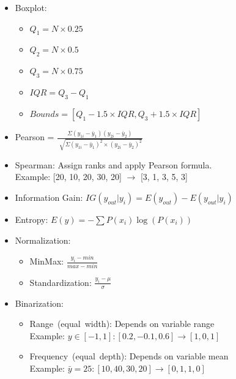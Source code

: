 \documentclass[twocolumn, 10pt]{article}
\begin{document}
\begin{itemize}[leftmargin=*, itemsep=0pt]
    \item Boxplot:
    \begin{itemize}[topsep=0pt, itemsep=0pt]
        \item $Q_{1}=N\times0.25$
        \item $Q_{2}=N\times0.5$
        \item $Q_{3}=N\times0.75$
        \item $IQR=Q_{3}-Q_{1}$
        \item $Bounds=[Q_{1}-1.5 \times IQR, Q_{3}+1.5 \times IQR]$
    \end{itemize}

    \item Pearson = $\displaystyle \frac{\Sigma(y_{1i}-\bar{y}_{1})(y_{2i}-\bar{y}_{2})}{\sqrt[]{\Sigma(y_{1i}-\bar{y}_{1})^2\times(y_{2i}-\bar{y}_{2})^2}}$

    \item Spearman: Assign ranks and apply Pearson formula. \\
    Example: [20, 10, 20, 30, 20] $\rightarrow$ [3, 1, 3, 5, 3]

    \item Information Gain: $IG(y_{out}|y_{i})=E(y_{out})-E(y_{out}|y_{i})$

    \item Entropy: $E(y)=-\sum P(x_i) \log(P(x_i))$
    
    \item Normalization:
    \begin{itemize}[topsep=0pt, itemsep=0pt]
        \item MinMax: $\displaystyle \frac{y_i-min}{max-min}$
        \item Standardization: $\displaystyle \frac{y_i-\mu}{\sigma}$
    \end{itemize}

    \item Binarization: 
    \begin{itemize}[topsep=0pt, itemsep=0pt]
        \item Range\ (equal\ width): Depends on variable range \\
        Example: $y\in[-1,1]: [0.2, -0.1, 0.6] \rightarrow [1, 0, 1]$
        \item Frequency\ (equal\ depth): Depends on variable mean \\
        Example: $\bar{y}=25: [10, 40, 30, 20] \rightarrow [0, 1, 1, 0]$
    \end{itemize} 


\end{itemize}
\end{document}
